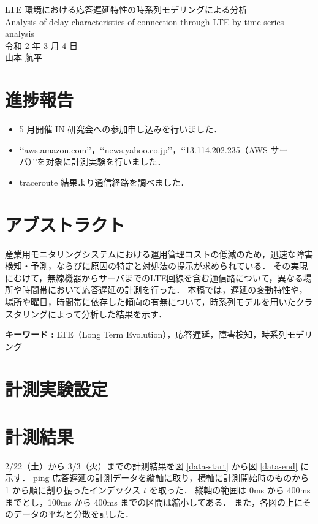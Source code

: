 \documentclass[a4j]{jarticle}
\begin{document}
\begin{table}[t]
\begin{center}
{\large LTE 環境における応答遅延特性の時系列モデリングによる分析}\\
Analysis of delay characteristics of connection through LTE by time series analysis\\
令和 2 年 3 月 4 日\\
山本 航平
\end{center}
\end{table}

\section{進捗報告}
\begin{itemize}
\item 5 月開催 IN 研究会への参加申し込みを行いました．
\item \lq{}\lq{}aws.amazon.com\rq{}\rq{}，\lq{}\lq{}news.yahoo.co.jp\rq{}\rq{}，\lq{}\lq{}13.114.202.235（AWS サーバ）\rq{}\rq{}を対象に計測実験を行いました．
\item traceroute 結果より通信経路を調べました．
\end{itemize}

\section{アブストラクト}
産業用モニタリングシステムにおける運用管理コストの低減のため，迅速な障害検知・予測，ならびに原因の特定と対処法の提示が求められている．
その実現にむけて，無線機器からサーバまでのLTE回線を含む通信路について，異なる場所や時間帯において応答遅延の計測を行った．
本稿では，遅延の変動特性や，場所や曜日，時間帯に依存した傾向の有無について，時系列モデルを用いたクラスタリングによって分析した結果を示す．

\textbf{キーワード : }LTE（Long Term Evolution），応答遅延，障害検知，時系列モデリング\\
\section{計測実験設定}

\section{計測結果}
2/22（土）から 3/3（火）までの計測結果を図 \ref{data-start} から図 \ref{data-end} に示す．
ping 応答遅延の計測データを縦軸に取り，横軸に計測開始時のものから 1 から順に割り振ったインデックス $t$ を取った．
縦軸の範囲は 0ms から 400ms までとし，100ms から 400ms までの区間は縮小してある．
また，各図の上にそのデータの平均と分散を記した．
\end{document}
